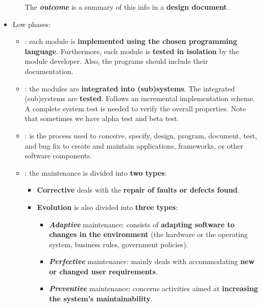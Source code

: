 \begin{itemize}
\begin{itemize}
        The \textcolor{Green4}{\textbf{\emph{outcome}}} is a summary of this info in a \textbf{design document}.
    \end{itemize}

    \item Low phases:
    \begin{itemize}
        \item \underline{}: each module is \textbf{implemented using the chosen programming language}. Furthermore, each module is \textbf{tested in isolation} by the module developer. Also, the programs should include their documentation.

        \item \underline{}: the modules are \textbf{integrated into (sub)systems}. The integrated (sub)systems are \textbf{tested}. Follows an incremental implementation scheme. A complete system test is needed to verify the overall properties. Note that sometimes we have alpha test and beta test.

        \item \underline{}: is the process used to conceive, specify, design, program, document, test, and bug fix to create and maintain applications, frameworks, or other software components.

        \item \underline{}: the maintenance is divided into \textbf{two types}:
        \begin{itemize}
            \item \textbf{Corrective} deals with the \textbf{repair of faults or defects found}.

            \item \textbf{Evolution} is also divided into \textbf{three types}:
            \begin{itemize}
                \item \textbf{\emph{Adaptive}} maintenance: consists of \textbf{adapting software to changes in the environment} (the hardware or the operating system, business rules, government policies).

                \item \textbf{\emph{Perfective}} maintenance: mainly deals with accommodating \textbf{new or changed user requirements}.

                \item \textbf{\emph{Preventive}} maintenance: concerns activities aimed at \textbf{increasing the system's maintainability}.
            \end{itemize}
        \end{itemize}
    \end{itemize}
\end{itemize}

